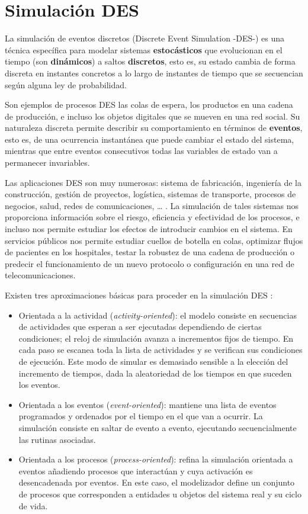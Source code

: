 \documentclass[
]{book}
\providecommand{\tightlist}{%
  \setlength{\itemsep}{0pt}\setlength{\parskip}{0pt}}
\theoremstyle{definition}
\theoremstyle{definition}
\theoremstyle{definition}
\theoremstyle{definition}
\theoremstyle{remark}
\begin{document}
\hypertarget{simulaciuxf3n-des}{%
\section{Simulación DES}\label{simulaciuxf3n-des}}

La simulación de eventos discretos (Discrete Event Simulation -DES-) es una técnica específica para modelar sistemas \textbf{estocásticos} que evolucionan en el tiempo (son \textbf{dinámicos}) a saltos \textbf{discretos}, esto es, su estado cambia de forma discreta en instantes concretos a lo largo de instantes de tiempo que se secuencian según alguna ley de probabilidad.

Son ejemplos de procesos DES las colas de espera, los productos en una cadena de producción, e incluso los objetos digitales que se mueven en una red social. Su naturaleza discreta permite describir su comportamiento en términos de \textbf{eventos}, esto es, de una ocurrencia instantánea que puede cambiar el estado del sistema, mientras que entre eventos consecutivos todas las variables de estado van a permanecer invariables.

Las aplicaciones DES son muy numerosas: sistema de fabricación, ingeniería de la construcción, gestión de proyectos, logística, sistemas de transporte, procesos de negocios, salud, redes de comunicaciones, \ldots{} \citep{banks}. La simulación de tales sistemas nos proporciona información sobre el riesgo, eficiencia y efectividad de los procesos, e incluso nos permite estudiar los efectos de introducir cambios en el sistema. En servicios públicos nos permite estudiar cuellos de botella en colas, optimizar flujos de pacientes en los hospitales, testar la robustez de una cadena de producción o predecir el funcionamiento de un nuevo protocolo o configuración en una red de telecomunicaciones.

Existen tres aproximaciones básicas para proceder en la simulación DES \citep{banks}:

\begin{itemize}
\tightlist
\item
  Orientada a la actividad (\emph{activity-oriented}): el modelo consiste en secuencias de actividades que esperan a ser ejecutadas dependiendo de ciertas condiciones; el reloj de simulación avanza a incrementos fijos de tiempo. En cada paso se escanea toda la lista de actividades y se verifican sus condiciones de ejecución. Este modo de simular es demasiado sensible a la elección del incremento de tiempos, dada la aleatoriedad de los tiempos en que suceden los eventos.
\item
  Orientada a los eventos (\emph{event-oriented}): mantiene una lista de eventos programados y ordenados por el tiempo en el que van a ocurrir. La simulación consiste en saltar de evento a evento, ejecutando secuencialmente las rutinas asociadas.
\item
  Orientada a los procesos (\emph{process-oriented}): refina la simulación orientada a eventos añadiendo procesos que interactúan y cuya activación es desencadenada por eventos. En este caso, el modelizador define un conjunto de procesos que corresponden a entidades u objetos del sistema real y su ciclo de vida.
\end{itemize}
\end{document}
